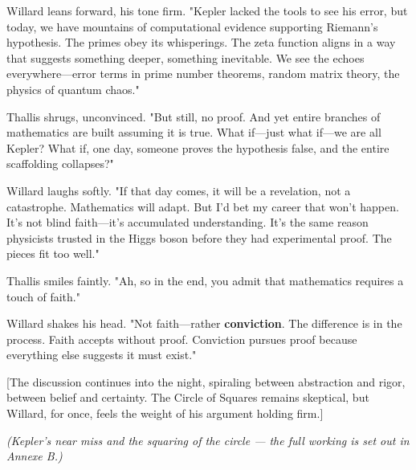 \smallskip

Willard leans forward, his tone firm.  
"Kepler lacked the tools to see his error, but today, we have mountains of computational evidence supporting Riemann’s hypothesis. The primes obey its whisperings. The zeta function aligns in a way that suggests something deeper, something inevitable. We see the echoes everywhere—error terms in prime number theorems, random matrix theory, the physics of quantum chaos."

\smallskip

Thallis shrugs, unconvinced.  
"But still, no proof. And yet entire branches of mathematics are built assuming it is true. What if—just what if—we are all Kepler? What if, one day, someone proves the hypothesis false, and the entire scaffolding collapses?"

\smallskip

Willard laughs softly.  
"If that day comes, it will be a revelation, not a catastrophe. Mathematics will adapt. But I’d bet my career that won’t happen. It’s not blind faith—it’s accumulated understanding. It’s the same reason physicists trusted in the Higgs boson before they had experimental proof. The pieces fit too well."

\smallskip

Thallis smiles faintly.  
"Ah, so in the end, you admit that mathematics requires a touch of faith."

\smallskip

Willard shakes his head.  
"Not faith—rather \textbf{conviction}. The difference is in the process. Faith accepts without proof. Conviction pursues proof because everything else suggests it must exist."

\smallskip

[The discussion continues into the night, spiraling between abstraction and rigor, between belief and certainty. The Circle of Squares remains skeptical, but Willard, for once, feels the weight of his argument holding firm.]

\textit{(Kepler's near miss and the squaring of the circle --- the full working is set out in Annexe B.)}

